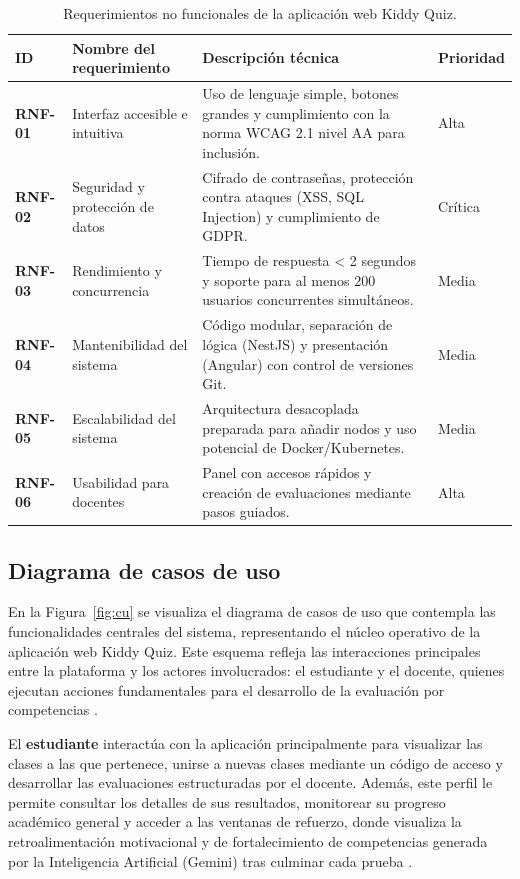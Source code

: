 \begin{table}[H]\centering
\caption{Requerimientos no funcionales de la aplicación web Kiddy Quiz.}\label{tab:rnf}
\footnotesize\renewcommand{\arraystretch}{1.2}
\begin{tabularx}{\textwidth}{|>{\bfseries}p{1.5cm}|p{4.2cm}|X|p{1.5cm}|}
\hline\rowcolor{headblue}\textbf{ID} & \textbf{Nombre del requerimiento} & \textbf{Descripción técnica} & \textbf{Prioridad}\\\hline
RNF-01 & Interfaz accesible e intuitiva & Uso de lenguaje simple, botones grandes y cumplimiento con la norma WCAG 2.1 nivel AA para inclusión. & Alta \\\hline
RNF-02 & Seguridad y protección de datos & Cifrado de contraseñas, protección contra ataques (XSS, SQL Injection) y cumplimiento de GDPR. & Crítica \\\hline
RNF-03 & Rendimiento y concurrencia & Tiempo de respuesta < 2 segundos y soporte para al menos 200 usuarios concurrentes simultáneos. & Media \\\hline
RNF-04 & Mantenibilidad del sistema & Código modular, separación de lógica (NestJS) y presentación (Angular) con control de versiones Git. & Media \\\hline
RNF-05 & Escalabilidad del sistema & Arquitectura desacoplada preparada para añadir nodos y uso potencial de Docker/Kubernetes. & Media \\\hline
RNF-06 & Usabilidad para docentes & Panel con accesos rápidos y creación de evaluaciones mediante pasos guiados. & Alta \\\hline
\end{tabularx}\end{table}
\elaboracion

\subsection{Diagrama de casos de uso}

En la Figura~\ref{fig:cu} se visualiza el diagrama de casos de uso que
contempla las funcionalidades centrales del sistema, representando el núcleo operativo de la aplicación web Kiddy Quiz. Este esquema refleja las interacciones principales entre la plataforma y los actores involucrados: el estudiante y el docente, quienes ejecutan acciones fundamentales para el desarrollo de la evaluación por competencias \cite{evans2020cbe}.

El \textbf{estudiante} interactúa con la aplicación principalmente para visualizar las clases a las que pertenece, unirse a nuevas clases mediante un código de acceso y desarrollar las evaluaciones estructuradas por el docente. Además, este perfil le permite consultar los detalles de sus resultados, monitorear su progreso académico general y acceder a las ventanas de refuerzo, donde visualiza la retroalimentación motivacional y de fortalecimiento de competencias generada por la Inteligencia Artificial (Gemini) tras culminar cada prueba \cite{maksimchuk2025genai}.


